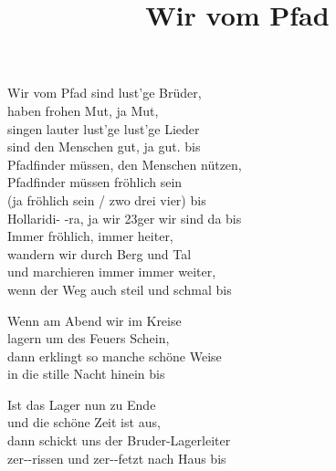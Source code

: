 \title{Wir vom Pfad} 

\begin{enumerate}
\verse {} Wir vom Pfad sind lust’ge Brüder, \\ 
haben frohen  Mut, ja Mut, \\ 
 singen lauter  lust’ge lust’ge Lieder \\ 
 sind den Menschen  gut, ja gut. bis \\ 
 {} Pfadfinder müssen, den Menschen nützen, \\ 
Pfadfinder  müssen fröhlich  sein \\ 
(ja fröhlich sein / zwo drei vier) bis \\ 
 Hollaridi- -ra, ja wir  23ger wir sind  da bis \\ 
\verse {} Immer fröhlich, immer heiter, \\ 
wandern wir durch  Berg und Tal \\ 
 und marchieren  immer immer weiter, \\ 
 wenn der Weg auch  steil und schmal bis \\ 
\Reff

\verse {} Wenn am Abend wir im Kreise \\ 
lagern um des  Feuers Schein, \\ 
 dann erklingt so manche schöne Weise \\ 
 in die stille Nacht hinein bis \Reff

\verse {} Ist das Lager nun zu Ende \\ 
und die schöne  Zeit ist aus, \\ 
 dann schickt uns der Bruder-Lagerleiter \\ 
zer--rissen und zer--fetzt nach Haus bis \\ 
\Reff

\end{enumerate}